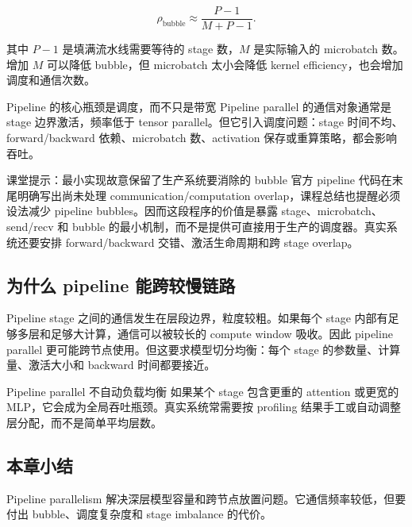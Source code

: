 \[
\rho_{\text{bubble}}
    \approx
\frac{P-1}{M+P-1}.
\]

其中 \(P-1\) 是填满流水线需要等待的 stage 数，\(M\) 是实际输入的 microbatch 数。增加 \(M\) 可以降低 bubble，但 microbatch 太小会降低 kernel efficiency，也会增加调度和通信次数。

\begin{importantbox}{Pipeline 的核心瓶颈是调度，而不只是带宽}
Pipeline parallel 的通信对象通常是 stage 边界激活，频率低于 tensor parallel。但它引入调度问题：stage 时间不均、forward/backward 依赖、microbatch 数、activation 保存或重算策略，都会影响吞吐。
\end{importantbox}

\begin{knowledgebox}{课堂提示：最小实现故意保留了生产系统要消除的 bubble}
官方 pipeline 代码在末尾明确写出尚未处理 communication/computation overlap，课程总结也提醒必须设法减少 pipeline bubbles。因而这段程序的价值是暴露 stage、microbatch、send/recv 和 bubble 的最小机制，而不是提供可直接用于生产的调度器。真实系统还要安排 forward/backward 交错、激活生命周期和跨 stage overlap。
\end{knowledgebox}

\subsection{为什么 pipeline 能跨较慢链路}

Pipeline stage 之间的通信发生在层段边界，粒度较粗。如果每个 stage 内部有足够多层和足够大计算，通信可以被较长的 compute window 吸收。因此 pipeline parallel 更可能跨节点使用。但这要求模型切分均衡：每个 stage 的参数量、计算量、激活大小和 backward 时间都要接近。

\begin{warningbox}{Pipeline parallel 不自动负载均衡}
如果某个 stage 包含更重的 attention 或更宽的 MLP，它会成为全局吞吐瓶颈。真实系统常需要按 profiling 结果手工或自动调整层分配，而不是简单平均层数。
\end{warningbox}

\subsection{本章小结}

Pipeline parallelism 解决深层模型容量和跨节点放置问题。它通信频率较低，但要付出 bubble、调度复杂度和 stage imbalance 的代价。

